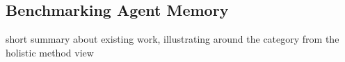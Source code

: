 \documentclass{llmxive}
\providecommand{\hi}[1]{\vspace{.25em} \noindent {\bf #1} }
\providecommand{\zw}[1]{#1}
\providecommand{\zxh}[1]{#1}
\begin{document}





\iffalse
\subsection{Benchmarking Agent Memory}

\zw{short summary about existing work, illustrating around the category from the holistic method view}
\end{document}
